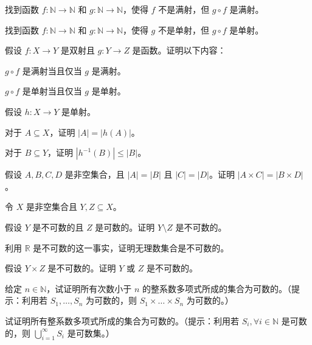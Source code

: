 \begin{problemset}
    \item 找到函数 $f : \mathbb{N} \to \mathbb{N}$ 和 $g : \mathbb{N} \to \mathbb{N}$，使得 $f$ 不是满射，但 $g \circ f$ 是满射。

    \item 找到函数 $f : \mathbb{N} \to \mathbb{N}$ 和 $g : \mathbb{N} \to \mathbb{N}$，使得 $g$ 不是单射，但 $g \circ f$ 是单射。

    \item 假设 $f : X \to Y$ 是双射且 $g : Y \to Z$ 是函数。证明以下内容：
    \begin{probenumerate}
        \item $g \circ f$ 是满射当且仅当 $g$ 是满射。
        \item $g \circ f$ 是单射当且仅当 $g$ 是单射。
    \end{probenumerate}

    \item 假设 $h : X \to Y$ 是单射。
    \begin{probenumerate}
        \item 对于 $A \subseteq X$，证明 $|A| = |h(A)|$。
        \item 对于 $B \subseteq Y$，证明 $|h^{-1}(B)| \leq |B|$。
    \end{probenumerate}

    \item 假设 $A, B, C, D$ 是非空集合，且 $|A| = |B|$ 且 $|C| = |D|$。证明 $|A \times C| = |B \times D|$。

    \item 令 $X$ 是非空集合且 $Y, Z \subseteq X$。
    \begin{probenumerate}
        \item 假设 $Y$ 是不可数的且 $Z$ 是可数的。证明 $Y \setminus Z$ 是不可数的。
        \item 利用 $\mathbb{R}$ 是不可数的这一事实，证明无理数集合是不可数的。
        \item 假设 $Y \times Z$ 是不可数的。证明 $Y$ 或 $Z$ 是不可数的。
    \end{probenumerate}

    \item 给定 $n \in \mathbb{N}$，试证明所有次数小于 $n$ 的整系数多项式所成的集合为可数的。（提示：利用若 $S_1, \dots, S_n$ 为可数的，则 $S_1 \times \dots \times S_n$ 为可数的。）

    \item 试证明所有整系数多项式所成的集合为可数的。（提示：利用若 $S_i, \forall i \in \mathbb{N}$ 是可数的，则 $\bigcup_{i=1}^{\infty} S_i$ 是可数集。）


\end{problemset}

